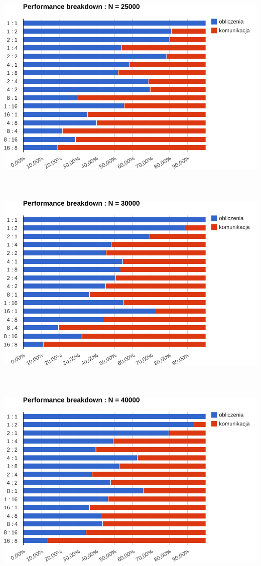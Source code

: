 \documentclass[paper=a4, fontsize=11pt]{scrartcl}	%
\numberwithin{equation}{section}		%
\numberwithin{figure}{section}			%
\numberwithin{table}{section}				%
\begin{document}
\includegraphics[width=135mm]{report/breakdown-25000.pdf} \\ \ \\ \ \\ \ \\

\includegraphics[width=135mm]{report/breakdown-30000.pdf} \\ \ \\ \ \\ \ \\

\includegraphics[width=135mm]{report/breakdown-40000.pdf} \\ \ \\ \ \\ \ \\
\end{document}
